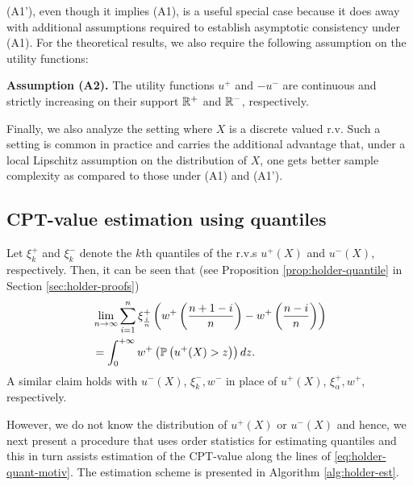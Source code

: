 (A1'), even though it implies (A1), is a useful special case because it does away with additional assumptions required to establish asymptotic consistency under (A1). For the theoretical results, we also require the following assumption on the utility functions:

\noindent\textbf{Assumption (A2).}  The utility functions $u^+$ and $-u^-$ are continuous and strictly increasing on their support $\mathbb{R}^+$ and $\mathbb{R}^-$, respectively.

Finally, we also analyze the setting where $X$ is a discrete valued r.v. Such a setting is common in practice and carries the additional advantage that, under a local Lipschitz assumption on the distribution of $X$, one gets better sample complexity as compared to those under (A1) and (A1'). 



\subsection{CPT-value estimation using quantiles}
Let $\xi^+_{k}$ and $\xi^-_{k}$ denote the $k$th quantiles of the r.v.s $u^+(X)$ and $u^-(X)$, respectively. 
Then, it can be seen that (see Proposition \ref{prop:holder-quantile} in Section \ref{sec:holder-proofs})
\begin{align}
&\lim_{n \rightarrow \infty} \sum_{i=1}^{n} \xi^+_{\frac{i}{n}} \left(w^+\left(\frac{n+1-i}{n}\right)- w^+\left(\frac{n-i}{n}\right) \right) \nonumber\\
&= \int_0^{+\infty} w^+\left(\mathbb{P}\left( u^+(X)>z \right)\right) dz.\label{eq:holder-quant-motiv}
\end{align}
A similar claim holds with $u^-(X)$, $\xi^-_{k}, w^-$ in place of  $u^+(X)$, $\xi^+_{\alpha}, w^+$, respectively. 

However, we do not know the distribution of $u^+(X)$ or $u^-(X)$ and hence, we next present a procedure that uses order statistics for estimating quantiles and this in turn assists estimation of the CPT-value along the lines of \eqref{eq:holder-quant-motiv}. The estimation scheme is presented in Algorithm \ref{alg:holder-est}.

